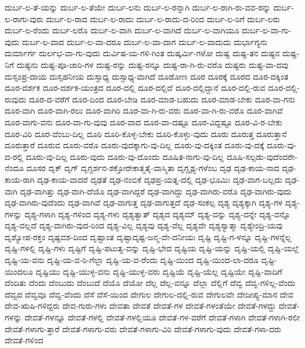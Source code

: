{ದುರ್ಬ-ಲ-ತೆ-ಯನ್ನು
ದುರ್ಬ-ಲ-ತೆಯೇ
ದುರ್ಬ-ಲನು
ದುರ್ಬ-ಲ-ರನ್ನಾಗಿ
ದುರ್ಬ-ಲ-ರಾಗಿ-ರು-ವವ-ರನ್ನು
ದುರ್ಬ-ಲ-ರಾಗು-ವುರು
ದುರ್ಬ-ಲ-ರಾದ
ದುರ್ಬ-ಲ-ರಾದು
ದುರ್ಬ-ಲ-ರಾದು-ದ-ರಿಂದ
ದುರ್ಬ-ಲ-ರಿಗೆ
ದುರ್ಬ-ಲರು
ದುರ್ಬ-ಲ-ರೆಂದು
ದುರ್ಬ-ಲರೊ
ದುರ್ಬ-ಲ-ವಾಗಿ
ದುರ್ಬ-ಲ-ವಾಗಿದೆ
ದುರ್ಬ-ಲ-ವಾಗಿಯೂ
ದುರ್ಬ-ಲ-ವಾ-ಗು-ವುದು
ದುರ್ಬ-ಲ-ವಾದ
ದುರ್ಬ-ಲ-ವಾ-ದರೂ
ದುರ್ಬ-ಲ-ವಾ-ದಾಗ
ದುರ್ಬ-ಲ-ವಾದುದು
ದುರ್ಭಾಗ್ಯನು
ದುರ್ಮಾರ್ಗ
ದುರ್ಲಭ-ವಾ-ಗು-ವುದು
ದುರ್ವಿಷ-ಯ-ಗಳಿ-ಗಿಂತ
ದುಷ್ಕರ್ಮಿ-ಗಳೋ
ದುಷ್ಟ
ದುಷ್ಟ-ತನ
ದುಷ್ಟನ
ದುಷ್ಟ-ನಿಗೆ
ದುಷ್ಟನು
ದುಷ್ಟ-ಪೂ-ಜಾರಿ-ಗಳ
ದುಷ್ಟ-ರನ್ನು
ದುಷ್ಟ-ರನ್ನೂ
ದುಷ್ಟ-ರಾ-ಗಿ-ರು-ವರೊ
ದುಷ್ಟರು
ದುಷ್ಟ-ವಾ-ದವು
ದುಸ್ಸಂಪ್ರ-ದಾಯ
ದುಸ್ಸಹನೀಯ
ದುಸ್ಸಾಧ್ಯ
ದುಸ್ಸಾಧ್ಯ-ವಾಗಿದೆ
ದೂಡೋಣ
ದೂರ
ದೂರಕ್ಕೆ
ದೂರದ
ದೂರ-ದಕ್ಕಿಂತ
ದೂರ-ದರ್ಶಕ
ದೂರ-ದರ್ಶಕ-ಯಂತ್ರದ
ದೂರ-ದಲ್ಲಿ
ದೂರ-ದಲ್ಲಿದೆ
ದೂರ-ದಲ್ಲಿದ್ದಾನೆ
ದೂರ-ದಲ್ಲಿ-ರುವ
ದೂರ-ದಲ್ಲಿ-ರುವುದು
ದೂರ-ದ-ವರೆಗೆ
ದೂರ-ದಿಂದ
ದೂರ-ಬೇಡಿ
ದೂರ-ಮಾಡ-ಬಹುದು
ದೂರ-ಮಾಡ-ಬೇಕು
ದೂರ-ವಾ-ಗನು
ದೂರ-ವಾಗಿ
ದೂರ-ವಾಗಿ-ರಲು
ದೂರ-ವಾಗಿರಿ
ದೂರ-ವಾ-ಗಿ-ರು-ವರು
ದೂರ-ವಾ-ಗಿ-ರು-ವರೊ
ದೂರ-ವಾಗಿವೆ
ದೂರ-ವಾಗು-ವನು
ದೂರ-ವಾ-ಗು-ವುವು
ದೂರ-ವಾದ
ದೂರ-ವಾ-ದಷ್ಟೂ
ದೂರ-ವಿದ್ದಷ್ಟೂ
ದೂರ-ವಿ-ರ-ಬೇಕು
ದೂರ-ವಿರಿ
ದೂರ-ವೆಂಬು-ದಿಲ್ಲ
ದೂರಿ
ದೂರಿ-ಕೊಳ್ಳ-ಬೇಕು
ದೂರಿ-ಕೊಳ್ಳು-ವುದು
ದೂರು
ದೂರುತ್ತ
ದೂರುತ್ತಾನೆ
ದೂರುತ್ತಾರೆ
ದೂರುವ
ದೂರು-ವರೊ
ದೂರು-ವುದಕ್ಕಾಗು-ವು-ದಿಲ್ಲ
ದೂರು-ವು-ದಕ್ಕಿಂತ
ದೂರು-ವು-ದಕ್ಕೆ
ದೂರು-ವು-ದ-ರಲ್ಲಿ
ದೂರು-ವು-ದಿಲ್ಲ
ದೂರು-ವುದು
ದೂರು-ವು-ದೊಂದು
ದೂಷಿತ-ನಾಗು-ವು-ದಿಲ್ಲ
ದೂಷಿ-ಸಲ್ಪಡು-ವುದೆಂದರೇ-ನೆಂದೂ
ದೂಸರ
ದೃಕ್
ದೃಗ್
ದೃಗ್ದರ್ಶನ-ಶಕ್ತೋರೇಕಾತ್ಮತೈ-ವಾಸ್ಮಿತಾ
ದೃಗ್ದೃಶ್ಯ-ಗಳೆಂಬ
ದೃಢ
ದೃಢ-ಕಾಯ-ನಾದ
ದೃಢ-ಕಾಯ-ರಾಗಿ
ದೃಢ-ಕಾಯ-ವಾದರೆ
ದೃಢತೆ
ದೃಢ-ನಂಬಿಕೆ
ದೃಢಪ್ರ-ಯತ್ನ-ದಲ್ಲಿ
ದೃಢ-ಭೂಮಿಃ
ದೃಢ-ವಾಗ-ಬಲ್ಲದು
ದೃಢ-ವಾಗಿ
ದೃಢ-ವಾಗಿತ್ತು
ದೃಢ-ವಾಗಿ-ದೆಯೊ
ದೃಢ-ವಾಗಿದ್ದರೆ
ದೃಢ-ವಾಗಿದ್ದು
ದೃಢ-ವಾಗಿರು-ವರೊ
ದೃಢ-ವಾಗಿರು-ವುದು
ದೃಢ-ವಾಗಿರು-ವುದೆಂದು
ದೃಢ-ವಾಗಿವೆ
ದೃಢ-ವಾಗುತ್ತ
ದೃಢ-ವಾಗುತ್ತದೆ
ದೃಢ-ಸಂಕಲ್ಪ
ದೃಶ್ಯ
ದೃಶ್ಯಕ್ಕಾಗಿ
ದೃಶ್ಯ-ಗಳ
ದೃಶ್ಯ-ಗಳನ್ನು
ದೃಶ್ಯ-ಗಳಾಗಿ
ದೃಶ್ಯ-ಗಳಿಂದ
ದೃಶ್ಯ-ಗಳು
ದೃಶ್ಯತ್ವಾತ್
ದೃಶ್ಯದ
ದೃಶ್ಯಮ್
ದೃಶ್ಯ-ವನ್ನು
ದೃಶ್ಯ-ವನ್ನೇ
ದೃಶ್ಯ-ವನ್ನೊ
ದೃಶ್ಯ-ವಲ್ಲದೆ
ದೃಶ್ಯ-ವಾಗಿರು-ವುದ-ರಿಂದ
ದೃಶ್ಯ-ವಿಲ್ಲ
ದೃಶ್ಯವು
ದೃಶ್ಯ-ವೆಲ್ಲ
ದೃಶ್ಯವೇ
ದೃಶ್ಯಸ್ಯಾತ್ಮಾ
ದೃಶ್ಯೇಂದ್ರಿ-ಯವು
ದೃಶ್ಯೋಪ-ರಕ್ತಂ
ದೃಷ್ಟವಶ-ದಿಂದ
ದೃಷ್ಟಾಂತ
ದೃಷ್ಟಾದೃಷ್ಟ-ಜನ್ಮ-ವೇ-ದನೀಯಃ
ದೃಷ್ಟಿ
ದೃಷ್ಟಿ-ಗ-ಳನ್ನೂ
ದೃಷ್ಟಿ-ಗಳನ್ನೆಲ್ಲ
ದೃಷ್ಟಿ-ಗಳಲ್ಲಿ
ದೃಷ್ಟಿ-ಗಳು
ದೃಷ್ಟಿಗೆ
ದೃಷ್ಟಿ-ಪಟುತ್ವ-ವನ್ನು
ದೃಷ್ಟಿ-ಭೇದ
ದೃಷ್ಟಿಯ
ದೃಷ್ಟಿ-ಯನ್ನು
ದೃಷ್ಟಿ-ಯಲ್ಲಿ
ದೃಷ್ಟಿ-ಯಲ್ಲೆ
ದೃಷ್ಟಿ-ಯ-ವನು
ದೃಷ್ಟಿ-ಯ-ವ-ರಿ-ಗೆಲ್ಲಾ
ದೃಷ್ಟಿ-ಯ-ವ-ರೆಂದು
ದೃಷ್ಟಿ-ಯಿಂದ
ದೃಷ್ಟಿ-ಯಿಂದ-ಲಾ-ದರೂ
ದೃಷ್ಟಿ-ಯಿಂದಲೂ
ದೃಷ್ಟಿಯು
ದೃಷ್ಟಿ-ಯುಳ್ಳ-ವನು
ದೃಷ್ಟಿ-ಯುಳ್ಳ-ವರು
ದೃಷ್ಟಿಯೆ
ದೃಷ್ಟಿ-ಯೆಲ್ಲ
ದೃಷ್ಟಿಯೇ
ದೃಷ್ಟಿ-ವಾದಿಗೆ
ದೆಂದಿತು
ದೆಂದು
ದೆಂಬುದು
ದೆಂಬುದೆ
ದೆಯೊ
ದೆಯೋ
ದೆಲ್ಲ
ದೆಲ್ಲ-ವನ್ನೂ
ದೆಲ್ಲಾ
ದೆಲ್ಲಿಗೆ
ದೆವ್ವ
ದೆವ್ವ-ಗಳಿಲ್ಲ-ವೆಂದು
ದೆವ್ವದ
ದೆವ್ವವೂ
ದೆವ್ವ-ವೆಂದು
ದೆಸೆ
ದೆಸೆ-ಯಿಂದ
ದೇಗುಲ
ದೇಗುಲ-ದಲ್ಲಿ-ರುವ
ದೇಗುಲವೇ
ದೇದೀಪ್ಯ-ಮಾನ
ದೇವ
ದೇವ-ಋಷಿ-ಗಳಿದ್ದರು
ದೇವ-ಗುರು-ಗಳು
ದೇವತಾ
ದೇವತೆ
ದೇವತೆ-ಗಳ
ದೇವತೆ-ಗಳಂತೆಯೇ
ದೇವತೆ-ಗಳದ್ದು
ದೇವತೆ-ಗಳನ್ನು
ದೇವತೆ-ಗಳನ್ನೂ
ದೇವತೆ-ಗಳಲ್ಲಿ
ದೇವತೆ-ಗಳಲ್ಲಿಯೂ
ದೇವತೆ-ಗಳ-ವರೆಗೆ
ದೇವತೆ-ಗಳಾಗಿ
ದೇವತೆ-ಗಳಾಗಿ-ರಲೀ
ದೇವತೆ-ಗಳಾಗು-ತ್ತಾರೆ
ದೇವತೆ-ಗಳಾಗು-ವರು
ದೇವತೆ-ಗಳಾಗು-ವಿರಿ
ದೇವತೆ-ಗಳಾಗು-ವುದು
ದೇವತೆ-ಗಳಾ-ದರು
ದೇವತೆ-ಗಳಿಂದ
}
